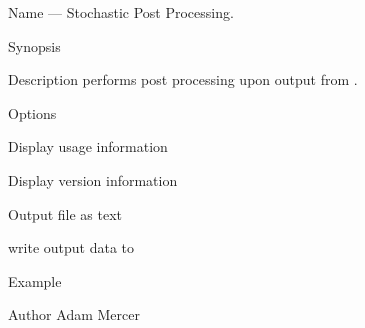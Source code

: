 \begin{entry}
\item[Name]
 --- Stochastic Post Processing.

\item[Synopsis]
  \newline \hspace*{0.5in}
 \newline \hspace*{0.5in}
 \newline \hspace*{0.5in}
 \newline \hspace*{0.5in}
 

\item[Description]  performs post processing upon
output from .

\item[Options]\leavevmode
\begin{entry}
\item[\option{--help}]
Display usage information
\item[\option{--version}]
Display version information
\item[\option{--text}]
Output file as text
\item[\option{--output} \parm{FILE}]
write output data to 
\end{entry}

\item[Example]

\item[Author]
Adam Mercer
\end{entry}
